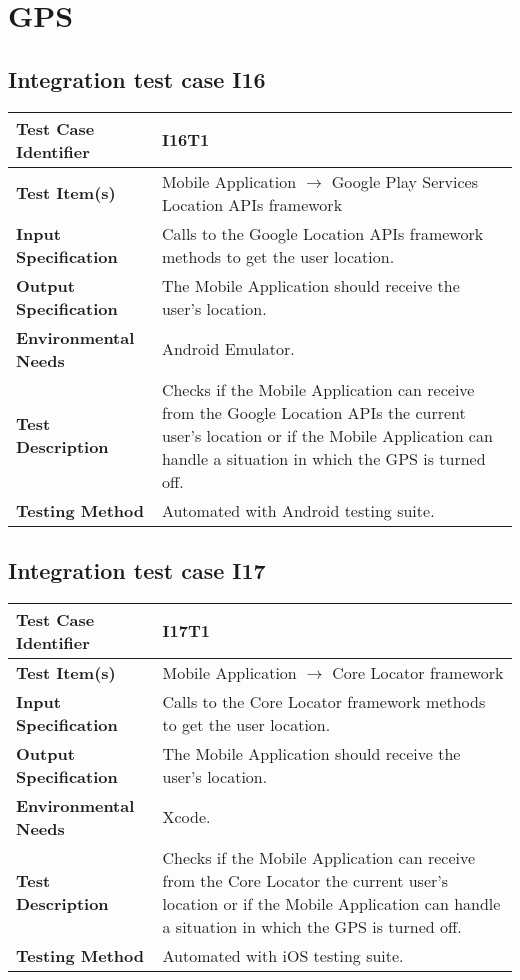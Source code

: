 \section{GPS}
\subsection{Integration test case I16}

\begin{tabular}{l p{}}
    \hline
    \textbf{Test Case Identifier} & I16T1\\
    \hline
    \textbf{Test Item(s)} & Mobile Application $\rightarrow$ Google Play Services Location APIs framework\\
    \hline
    \textbf{Input Specification} & Calls to the Google Location APIs framework methods to get the user location.\\
    \hline
    \textbf{Output Specification} & The Mobile Application should receive the user’s location.\\
    \hline
    \textbf{Environmental Needs} & Android Emulator.\\
    \hline
    \textbf{Test Description} & Checks if the Mobile Application can receive from the Google Location APIs the current user’s location or if the Mobile Application can handle a situation in which the GPS is turned off. \\
    \hline
    \textbf{Testing Method} & Automated with Android testing suite.\\
    \hline
\end{tabular}

\subsection{Integration test case I17}

\begin{tabular}{l p{}}
    \hline
    \textbf{Test Case Identifier} & I17T1\\
    \hline
    \textbf{Test Item(s)} & Mobile Application $\rightarrow$ Core Locator framework\\
    \hline
    \textbf{Input Specification} & Calls to the Core Locator framework methods to get the user location.\\
    \hline
    \textbf{Output Specification} & The Mobile Application should receive the user’s location.\\
    \hline
    \textbf{Environmental Needs} & Xcode.\\
    \hline
    \textbf{Test Description} & Checks if the Mobile Application can receive from the Core Locator the current user’s location or if the Mobile Application can handle a situation in which the GPS is turned off. \\
    \hline
    \textbf{Testing Method} & Automated with iOS testing suite.\\
    \hline
\end{tabular}
